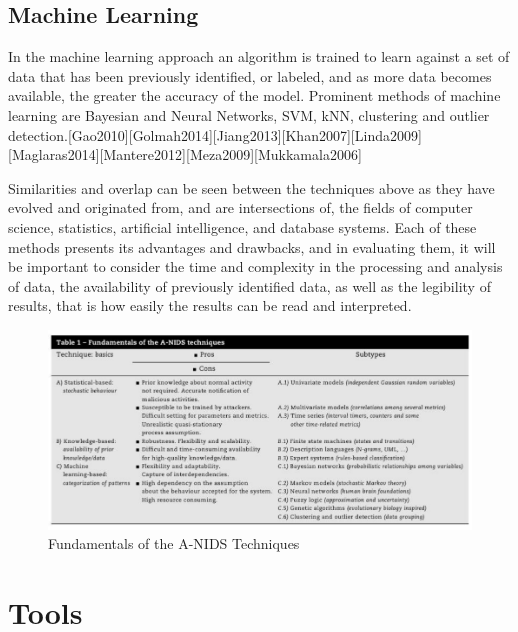 \documentclass[12pt,]{article}
\begin{document}
\subsection{Machine Learning}\label{machine-learning}

In the machine learning approach an algorithm is trained to learn
against a set of data that has been previously identified, or labeled,
and as more data becomes available, the greater the accuracy of the
model. Prominent methods of machine learning are Bayesian and Neural
Networks, SVM, kNN, clustering and outlier
detection.{[}Gao2010{]}{[}Golmah2014{]}{[}Jiang2013{]}{[}Khan2007{]}{[}Linda2009{]}
{[}Maglaras2014{]}{[}Mantere2012{]}{[}Meza2009{]}{[}Mukkamala2006{]}

Similarities and overlap can be seen between the techniques above as
they have evolved and originated from, and are intersections of, the
fields of computer science, statistics, artificial intelligence, and
database systems. Each of these methods presents its advantages and
drawbacks, and in evaluating them, it will be important to consider the
time and complexity in the processing and analysis of data, the
availability of previously identified data, as well as the legibility of
results, that is how easily the results can be read and interpreted.

\begin{figure}

{\centering \includegraphics{thesis_files/figure-latex/unnamed-chunk-12-1} 

}

\caption{Fundamentals of the A-NIDS Techniques}\label{fig:unnamed-chunk-12}
\end{figure}

\pagebreak

\section{Tools}\label{tools}
\end{document}
